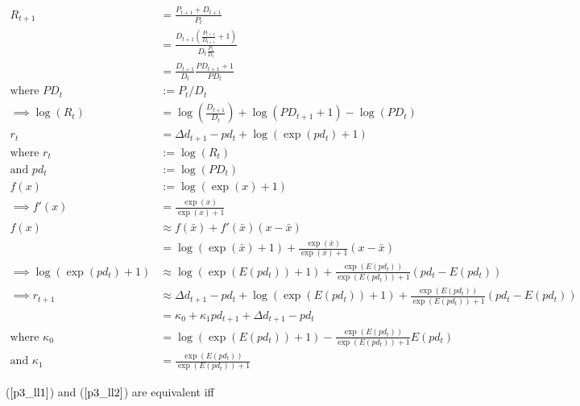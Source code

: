 \documentclass{article}
\begin{document}
\begin{align*}
R_{t+1} 
&= \frac{P_{t+1} + D_{t+1}}{P_t}\\
&= \frac{D_{t+1}(\frac{P_{t+1}}{D_{t+1}} + 1)}{D_t \frac{P_t}{D_t}}\\
&= \frac{D_{t+1}}{D_t} \frac{PD_{t+1} + 1}{PD_{t}}\\
\text{where } PD_t &:= P_t/D_t \\
\implies
\log(R_t) &= \log(\frac{D_{t+1}}{D_t}) + \log(PD_{t+1} + 1) - \log(PD_t)\\
r_t &= \Delta d_{t+1} - pd_t + \log(\exp(pd_t)+1)\\
\text{where } r_t &:= \log(R_t)\\
\text{and } pd_t &:= \log(PD_t)\\
f(x) &:= \log(\exp(x) + 1)\\
\implies
f'(x) &= \frac{\exp(x)}{\exp(x) + 1} \\
f(x) &\approx f(\bar{x}) + f'(\bar{x})(x - \bar{x}) \\ 
&= \log(\exp(\bar{x}) + 1) + \frac{\exp(\bar{x})}{\exp(\bar{x}) + 1}(x - \bar{x})\\
\implies
\log(\exp(pd_t)+1) &\approx \log(\exp(E(pd_t))+1) + \frac{\exp(E(pd_t))}{\exp(E(pd_t)) + 1}(pd_t - E(pd_t)) \\
\implies
r_{t+1} &\approx \Delta d_{t+1} - pd_t + \log(\exp(E(pd_t))+1) + \frac{\exp(E(pd_t))}{\exp(E(pd_t)) + 1}(pd_t - E(pd_t)) \\
&= \kappa_0 + \kappa_1 pd_{t+1} + \Delta d_{t+1} - pd_t \\
\text{where }
\kappa_0 &= \log(\exp(E(pd_t))+1) - \frac{\exp(E(pd_t))}{\exp(E(pd_t)) + 1}E(pd_t)\\
\text{and }
\kappa_1 &= \frac{\exp(E(pd_t))}{\exp(E(pd_t)) + 1}
\end{align*}

\pagebreak

($\ref{p3_ll1}$) and ($\ref{p3_ll2}$) are equivalent iff 
\end{document}
